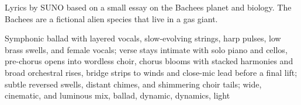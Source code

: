 
\begin{notes}
Lyrics by SUNO based on a small essay on the Bachees planet and biology. The Bachees are a fictional alien species that live in a gas giant.
\end{notes}
\begin{style}
Symphonic ballad with layered vocals, slow-evolving strings, harp pulses, low brass swells, and female vocals; verse stays intimate with solo piano and cellos, pre-chorus opens into wordless choir, chorus blooms with stacked harmonies and broad orchestral rises, bridge strips to winds and close-mic lead before a final lift; subtle reversed swells, distant chimes, and shimmering choir tails; wide, cinematic, and luminous mix, ballad, dynamic, dynamics, light
\end{style}

